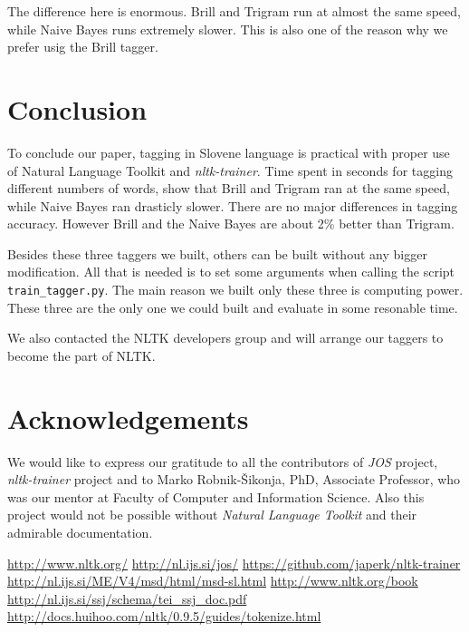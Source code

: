 \documentclass[10pt, conference, compsocconf]{IEEEtran}
\begin{document}
The difference here is enormous. Brill and Trigram run at almost the same speed, while Naive Bayes runs extremely slower. This is also one of the reason why we prefer usig the Brill tagger. 

\section{Conclusion} %
To conclude our paper, tagging in Slovene language is practical with proper use of Natural Language Toolkit and \textit{nltk-trainer}. Time spent in seconds for tagging different numbers of words, show that Brill and Trigram ran at the same speed, while Naive Bayes ran drasticly slower. There are no major differences in tagging accuracy. However Brill and the Naive Bayes are about 2\% better than Trigram.
\par
Besides these three taggers we built, others can be built without any bigger modification. All that is needed is to set some arguments when calling the script \texttt{train\_tagger.py}. The main reason we built only these three is computing power. These three are the only one we could built and evaluate in some resonable time.
\par
We also contacted the NLTK developers group and will arrange our taggers to become the part of NLTK.

\section*{Acknowledgements}
We would like to express our gratitude to all the contributors of \textit{JOS} \cite{JOS} project, \textit{nltk-trainer} \cite{nltk-trainer} project and to Marko Robnik-Šikonja, PhD, Associate Professor, who was our mentor at Faculty of Computer and Information Science. Also this project would not be possible without \textit{Natural Language Toolkit} \cite{nltk} and their admirable documentation.

\begin{thebibliography}{99}
 \url{http://www.nltk.org/}
 \url{http://nl.ijs.si/jos/}
 \url{https://github.com/japerk/nltk-trainer}
 \url{http://nl.ijs.si/ME/V4/msd/html/msd-sl.html}
 \url{http://www.nltk.org/book}
 \url{http://nl.ijs.si/ssj/schema/tei_ssj_doc.pdf}
 \url{http://docs.huihoo.com/nltk/0.9.5/guides/tokenize.html}
\end{thebibliography}
\end{document}
